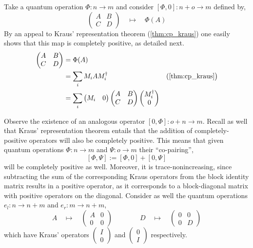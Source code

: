 Take a quantum operation $\Phi : n \to m$ and consider $[\Phi
,0] : n+o \to m$ defined by,
\[
 \begin{pmatrix}
         A & B 
         \\
         C & D
 \end{pmatrix} 
 \quad
 \longmapsto 
 \quad
 \Phi(A)
\]
By an appeal to Kraus' representation theorem (\autoref{thm:cp_kraus}) one easily shows that this map is completely positive, as detailed next.  
\begin{align*}
        [\Phi, 0]
        \begin{pmatrix}
         A & B 
         \\
         C & D
        \end{pmatrix} 
        & =
        \Phi(A)
        \\
        &
        = 
        \sum_i M_i A M^\dagger_i
        & (\text{\autoref{thm:cp_kraus}} \big )
        \\
        &
        = \sum_i 
        \begin{pmatrix}
        M_i & 0 
        \end{pmatrix} 
        \begin{pmatrix}
        A & B
         \\
        C & D
        \end{pmatrix} 
        \begin{pmatrix}
        M_i^\dagger \\
        0 
        \end{pmatrix} 
\end{align*}

Observe the existence of an analogous operator $[0,\Phi] : o + n \to m$.
Recall as well that Kraus' representation theorem entails that the addition of
completely-positive operators will also be completely positive.
This means that
given quantum operations $\Phi : n \to m$ and $\Psi : o \to m$ their
``co-pairing'',
\[
        [\Phi, \Psi] := [\Phi, 0] + [0, \Psi]
\]
will be completely positive as well. Moreover, it is trace-nonincreasing, since subtracting the sum of the corresponding Kraus operators from the block identity matrix results in a positive operator, as it corresponds to a block-diagonal matrix with positive operators on the diagonal. Consider as well the quantum operations $e_l : n \to n +m$ and
$e_r : m \to n + m$,
\[
        A \quad \longmapsto \quad
        \begin{pmatrix}
                A & 0 
                \\
                0 & 0
        \end{pmatrix}
        \qquad
        \qquad
        D \quad \longmapsto \quad
        \begin{pmatrix}
                0 & 0 
                \\
                0 & D
        \end{pmatrix}
\]
which have Kraus' operators $\begin{pmatrix} I \\ 0 \end{pmatrix}$ and
$\begin{pmatrix} 0 \\ I \end{pmatrix}$ respectively.  


